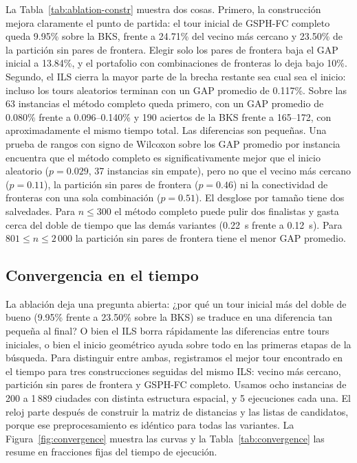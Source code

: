 \documentclass[runningheads]{llncs}
\begin{document}
La Tabla~\ref{tab:ablation-constr} muestra dos cosas. Primero, la
construcción mejora claramente el punto de partida: el tour inicial de
GSPH-FC completo queda 9.95\% sobre la BKS, frente a 24.71\% del vecino
más cercano y 23.50\% de la partición sin pares de frontera. Elegir solo
los pares de frontera baja el GAP inicial a 13.84\%, y el portafolio con
combinaciones de fronteras lo deja bajo 10\%. Segundo, el ILS cierra la
mayor parte de la brecha restante sea cual sea el inicio: incluso los
tours aleatorios terminan con un GAP promedio de 0.117\%. Sobre las 63
instancias el método completo queda primero, con un GAP promedio de
0.080\% frente a 0.096--0.140\% y 190 aciertos de la BKS frente a
165--172, con aproximadamente el mismo tiempo total. Las diferencias son
pequeñas. Una prueba de rangos con signo de Wilcoxon sobre los GAP
promedio por instancia encuentra que el método completo es
significativamente mejor que el inicio aleatorio ($p=0.029$, 37
instancias sin empate), pero no que el vecino más cercano ($p=0.11$), la
partición sin pares de frontera ($p=0.46$) ni la conectividad de
fronteras con una sola combinación ($p=0.51$). El desglose por tamaño
tiene dos salvedades. Para $n\le 300$ el método completo puede pulir dos
finalistas y gasta cerca del doble de tiempo que las demás variantes
(0.22~s frente a 0.12~s). Para $801\le n\le 2\,000$ la partición sin
pares de frontera tiene el menor GAP promedio.

\subsection{Convergencia en el tiempo}
\label{sec:convergence}

La ablación deja una pregunta abierta: ¿por qué un tour inicial más del
doble de bueno (9.95\% frente a 23.50\% sobre la BKS) se traduce en una
diferencia tan pequeña al final? O bien el ILS borra rápidamente las
diferencias entre tours iniciales, o bien el inicio geométrico ayuda
sobre todo en las primeras etapas de la búsqueda. Para distinguir entre
ambas, registramos el mejor tour encontrado en el tiempo para tres
construcciones seguidas del mismo ILS: vecino más cercano, partición sin
pares de frontera y GSPH-FC completo. Usamos ocho instancias de 200 a
1\,889 ciudades con distinta estructura espacial, y 5 ejecuciones cada
una. El reloj parte después de construir la matriz de distancias y las
listas de candidatos, porque ese preprocesamiento es idéntico para todas
las variantes. La Figura~\ref{fig:convergence} muestra las curvas y la
Tabla~\ref{tab:convergence} las resume en fracciones fijas del tiempo de
ejecución.
\end{document}
